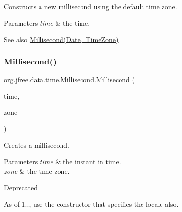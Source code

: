 Constructs a new millisecond using the default time zone.


\begin{DoxyParams}{Parameters}
{\em time} & the time.\\
\hline
\end{DoxyParams}
\begin{DoxySeeAlso}{See also}
\mbox{\hyperlink{classorg_1_1jfree_1_1data_1_1time_1_1_millisecond_a2bff893aab6dfdc25693fbf954ac34da}{Millisecond(\+Date, Time\+Zone)}} 
\end{DoxySeeAlso}
\mbox{\label{classorg_1_1jfree_1_1data_1_1time_1_1_millisecond_a2bff893aab6dfdc25693fbf954ac34da}} 
\subsubsection{\texorpdfstring{Millisecond()}{Millisecond()}\hspace{0.1cm}{\footnotesize\ttfamily [5/6]}}
{\footnotesize\ttfamily org.\+jfree.\+data.\+time.\+Millisecond.\+Millisecond (\begin{DoxyParamCaption}\item[{Date}]{time,  }\item[{Time\+Zone}]{zone }\end{DoxyParamCaption})}

Creates a millisecond.


\begin{DoxyParams}{Parameters}
{\em time} & the instant in time. \\
\hline
{\em zone} & the time zone.\\
\hline
\end{DoxyParams}
\begin{DoxyRefDesc}{Deprecated}
\item[\mbox{\hyperlink{deprecated__deprecated000267}{Deprecated}}]As of 1.., use the constructor that specifies the locale also. \end{DoxyRefDesc}
\mbox{\label{classorg_1_1jfree_1_1data_1_1time_1_1_millisecond_a7a133f8dac8a73fdebd75dab39e4b0c2}} 
